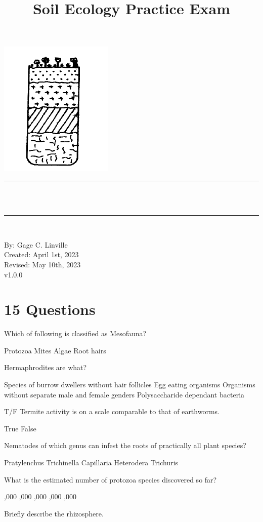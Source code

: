 \documentclass[12pt]{exam}
\title{Soil Ecology Practice Exam}					%
\author{\studentone}				                %
\makeatletter
\newcommand{\semanticversion}{v1.0.0}               %
\newcommand{\studentone}{Gage C. Linville}			%
\newcommand{\studentwebsite}{soils.land}            %
\newcommand{\creationdate}{April 1st, 2023}
\newcommand{\revisiondate}{May 10th, 2023}
\def\maketitle{%
  \null
  \thispagestyle{empty}
  \begin{center}\leavevmode
       \normalfont
       \includegraphics[width=0.20\columnwidth]{figures/Image_Edit.png}
	\rule{\linewidth}{0.2 mm} \\[0.4 cm]
	{ \huge \bfseries \@title}\\
	\rule{\linewidth}{0.2 mm} \\[0.4 cm]

	\begin{minipage}{0.5\textwidth}
		\begin{center} \large
			By: \studentone\\
            Created: \creationdate\\
            Revised: \revisiondate\\
            \semanticversion\\
			\end{center}
			\end{minipage}
   \end{center}
   \vfill
   \null
   \cleardoublepage
  }
\makeatother
\begin{document}
\maketitle
\let\cleardoublepage\clearpage
\sloppy


\section*{15 Questions}
\begin{questions}
\question Which of following is classified as Mesofauna?

\begin{oneparchoices}
 \choice Protozoa
 \choice Mites %
 \choice Algae
 \choice Root hairs
\end{oneparchoices}

\question Hermaphrodites are what?

\begin{choices}
 \choice Species of burrow dwellers without hair follicles
 \choice Egg eating organisms
 \choice Organisms without separate male and female genders %
 \choice Polysaccharide dependant bacteria
\end{choices}

\question T/F Termite activity is on a scale comparable to that of earthworms.

\begin{oneparchoices}
 \choice True %
 \choice False
\end{oneparchoices}

\question Nematodes of which genus can infest the roots of practically all plant species?

\begin{oneparchoices}
 \choice Pratylenchus
 \choice Trichinella
 \choice Capillaria
 \choice Heterodera %
 \choice Trichuris
\end{oneparchoices}

\question What is the estimated number of protozoa species discovered so far?

\begin{oneparchoices}
 ,000
 ,000
 ,000 %
 ,000
 ,000
\end{oneparchoices}

\question Briefly describe the rhizosphere.
\vspace{0.8in}


\end{questions}
\end{document}
